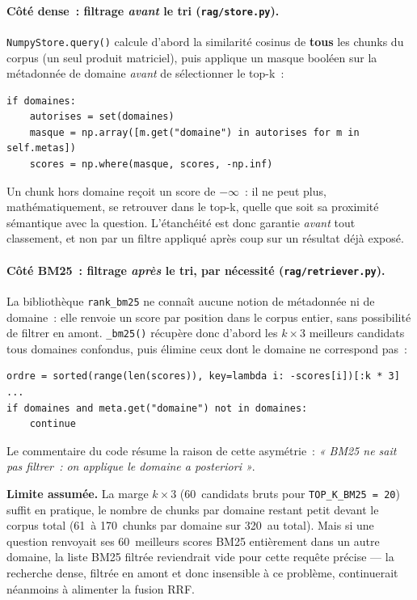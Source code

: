 \documentclass[11pt]{article}
\begin{document}
\paragraph{Côté dense~: filtrage \emph{avant} le tri (\texttt{rag/store.py}).}
\texttt{NumpyStore.query()} calcule d'abord la similarité cosinus de \textbf{tous} les chunks du
corpus (un seul produit matriciel), puis applique un masque booléen sur la métadonnée de domaine
\emph{avant} de sélectionner le top-k~:

\begin{verbatim}
if domaines:
    autorises = set(domaines)
    masque = np.array([m.get("domaine") in autorises for m in self.metas])
    scores = np.where(masque, scores, -np.inf)
\end{verbatim}

Un chunk hors domaine reçoit un score de $-\infty$~: il ne peut plus, mathématiquement, se
retrouver dans le top-k, quelle que soit sa proximité sémantique avec la question. L'étanchéité est
donc garantie \emph{avant} tout classement, et non par un filtre appliqué après coup sur un
résultat déjà exposé.

\paragraph{Côté BM25~: filtrage \emph{après} le tri, par nécessité (\texttt{rag/retriever.py}).}
La bibliothèque \texttt{rank\_bm25} ne connaît aucune notion de métadonnée ni de domaine~: elle
renvoie un score par position dans le corpus entier, sans possibilité de filtrer en amont.
\texttt{\_bm25()} récupère donc d'abord les $k \times 3$ meilleurs candidats tous domaines
confondus, puis élimine ceux dont le domaine ne correspond pas~:

\begin{verbatim}
ordre = sorted(range(len(scores)), key=lambda i: -scores[i])[:k * 3]
...
if domaines and meta.get("domaine") not in domaines:
    continue
\end{verbatim}

Le commentaire du code résume la raison de cette asymétrie~: \textit{« BM25 ne sait pas filtrer~:
on applique le domaine a posteriori »}.

\textbf{Limite assumée.} La marge $k \times 3$ (60~candidats bruts pour
\texttt{TOP\_K\_BM25~=~20}) suffit en pratique, le nombre de chunks par domaine restant petit
devant le corpus total (61~à 170~chunks par domaine sur 320~au total). Mais si une question
renvoyait ses 60~meilleurs scores BM25 entièrement dans un autre domaine, la liste BM25 filtrée
reviendrait vide pour cette requête précise --- la recherche dense, filtrée en amont et donc
insensible à ce problème, continuerait néanmoins à alimenter la fusion RRF.
\end{document}
